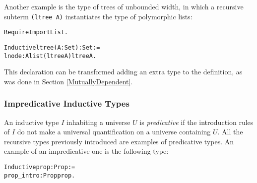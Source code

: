 \documentclass[11pt]{article}
\begin{document}

Another example is the type of trees 
 of unbounded width, in which a recursive subterm 
\texttt{(ltree A)} instantiates the type  of polymorphic lists:

\begin{alltt} 
Require Import List.

Inductive ltree  (A:Set) : Set :=  
          lnode   : A {\arrow} list (ltree A) {\arrow} ltree A.
\end{alltt}

This declaration can be transformed  
adding an extra type to the definition, as was done in Section
\ref{MutuallyDependent}.


\subsubsection{Impredicative Inductive Types}

An inductive type $I$ inhabiting a universe $U$ is \textsl{predicative}
if the introduction rules of $I$ do not make a universal
quantification on a universe containing $U$. All the recursive types
previously introduced are examples of predicative types. An example of
an impredicative one is the following type:



\begin{alltt}
Inductive prop : Prop :=
 prop_intro : Prop {\arrow} prop.
\end{alltt}
\end{document}
